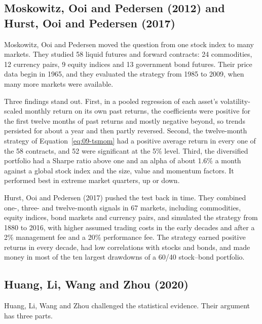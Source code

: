 \subsection{Moskowitz, Ooi and Pedersen (2012) and Hurst, Ooi and Pedersen (2017)}

Moskowitz, Ooi and Pedersen moved the question from one stock index to many markets. They studied 58 liquid futures and forward contracts: 24 commodities, 12 currency pairs, 9 equity indices and 13 government bond futures. Their price data begin in 1965, and they evaluated the strategy from 1985 to 2009, when many more markets were available.

Three findings stand out. First, in a pooled regression of each asset's volatility-scaled monthly return on its own past returns, the coefficients were positive for the first twelve months of past returns and mostly negative beyond, so trends persisted for about a year and then partly reversed. Second, the twelve-month strategy of Equation~\eqref{eq:09-tsmom} had a positive average return in every one of the 58 contracts, and 52 were significant at the 5\% level. Third, the diversified portfolio had a Sharpe ratio above one and an alpha of about 1.6\% a month against a global stock index and the size, value and momentum factors. It performed best in extreme market quarters, up or down.

Hurst, Ooi and Pedersen (2017) pushed the test back in time. They combined one-, three- and twelve-month signals in 67 markets, including commodities, equity indices, bond markets and currency pairs, and simulated the strategy from 1880 to 2016, with higher assumed trading costs in the early decades and after a 2\% management fee and a 20\% performance fee. The strategy earned positive returns in every decade, had low correlations with stocks and bonds, and made money in most of the ten largest drawdowns of a 60/40 stock--bond portfolio.

\subsection{Huang, Li, Wang and Zhou (2020)}

Huang, Li, Wang and Zhou challenged the statistical evidence. Their argument has three parts.

